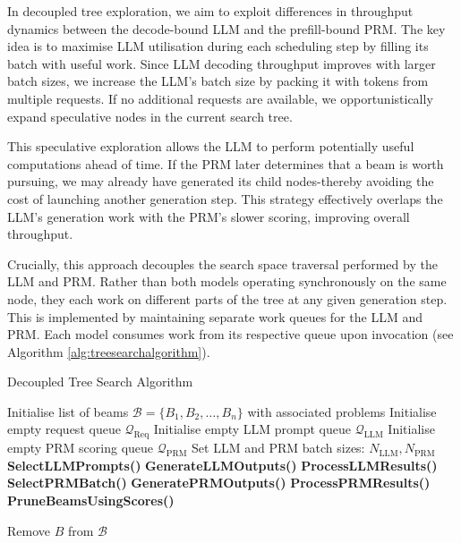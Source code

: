 \documentclass[12pt,twoside]{report}
\begin{document}
In decoupled tree exploration, we aim to exploit differences in throughput dynamics between the decode-bound LLM and the prefill-bound PRM. 
The key idea is to maximise LLM utilisation during each scheduling step by filling its batch with useful work. 
Since LLM decoding throughput improves with larger batch sizes, we increase the LLM’s batch size by packing it with tokens from multiple requests. 
If no additional requests are available, we opportunistically expand speculative nodes in the current search tree.

This speculative exploration allows the LLM to perform potentially useful computations ahead of time. 
If the PRM later determines that a beam is worth pursuing, we may already have generated its child nodes-thereby avoiding the cost of launching another generation step. 
This strategy effectively overlaps the LLM’s generation work with the PRM’s slower scoring, improving overall throughput.

Crucially, this approach decouples the search space traversal performed by the LLM and PRM. 
Rather than both models operating synchronously on the same node, they each work on different parts of the tree at any given generation step. 
This is implemented by maintaining separate work queues for the LLM and PRM. Each model consumes work from its respective queue upon invocation (see Algorithm \ref{alg:treesearchalgorithm}).

\begin{algorithm}[H]\label{alg:treesearchalgorithm}
\caption{Decoupled Tree Search Algorithm} 
\begin{algorithmic}[1]
\State Initialise list of beams $\mathcal{B} = \{B_1, B_2, \dots, B_n\}$ with associated problems
\State Initialise empty request queue $\mathcal{Q}_{\text{Req}}$
\State Initialise empty LLM prompt queue $\mathcal{Q}_{\text{LLM}}$
\State Initialise empty PRM scoring queue $\mathcal{Q}_{\text{PRM}}$
\State Set LLM and PRM batch sizes: $N_{\text{LLM}}, N_{\text{PRM}}$
    \State \textbf{SelectLLMPrompts()}
    \State \textbf{GenerateLLMOutputs()}
    \State \textbf{ProcessLLMResults()}
    \State \textbf{SelectPRMBatch()}
    \State \textbf{GeneratePRMOutputs()}
    \State \textbf{ProcessPRMResults()}
    \State \textbf{PruneBeamsUsingScores()}

        \State Remove $B$ from $\mathcal{B}$
      \EndIf
    \EndFor
\EndWhile
\end{algorithmic}
\end{algorithm}
\end{document}
